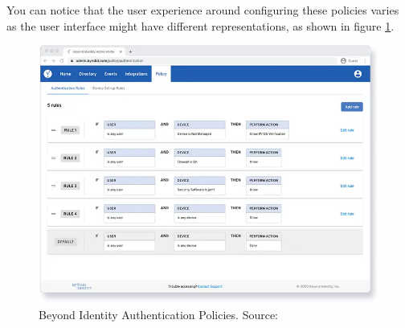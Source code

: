 You can notice that the user experience around configuring these policies varies as the user interface might have different representations, as shown in figure \ref{fig:beyond-identity-auth-policy}. \cite{existing-beyond-identity}

\begin{figure}[htbp]
  \centering
  \includegraphics[width=1\textwidth]{img/beyond-auth-policy.png}
  \caption[Beyond Identity Authentication Policies]{Beyond Identity Authentication Policies. Source: \cite{existing-beyond-identity}}
  \label{fig:beyond-identity-auth-policy}
\end{figure}

\newpage